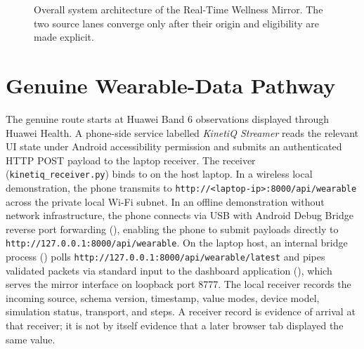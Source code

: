 \begin{figure}[H]
{}
\caption[Overall system architecture]{Overall system architecture of the Real-Time Wellness Mirror. The two source lanes converge only after their origin and eligibility are made explicit.}
\label{fig:overall-architecture}
\end{figure}

\section{Genuine Wearable-Data Pathway}
The genuine route starts at Huawei Band 6 observations displayed through Huawei Health. A phone-side service labelled \textit{KinetiQ Streamer} reads the relevant UI state under Android accessibility permission and submits an authenticated HTTP POST payload to the laptop receiver. The receiver (\nolinkurl{kinetiq_receiver.py}) binds to  on the host laptop. In a wireless local demonstration, the phone transmits to \nolinkurl{http://<laptop-ip>:8000/api/wearable} across the private local Wi-Fi subnet. In an offline demonstration without network infrastructure, the phone connects via USB with Android Debug Bridge reverse port forwarding (), enabling the phone to submit payloads directly to \nolinkurl{http://127.0.0.1:8000/api/wearable}. On the laptop host, an internal bridge process () polls \nolinkurl{http://127.0.0.1:8000/api/wearable/latest} and pipes validated packets via standard input to the dashboard application (), which serves the mirror interface on loopback port 8777. The local receiver records the incoming source, schema version, timestamp, value modes, device model, simulation status, transport, and steps. A receiver record is evidence of arrival at that receiver; it is not by itself evidence that a later browser tab displayed the same value.

